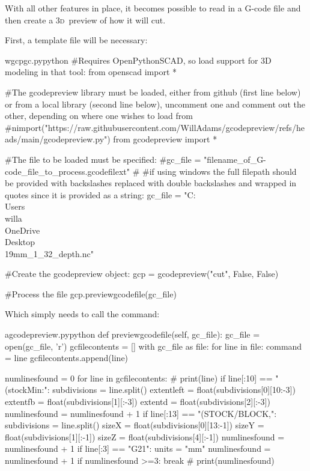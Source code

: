 \documentclass{ltxdoc}
\begin{document}
With all other features in place, it becomes possible to read in a G-code file and then create a \textsc{3d}~preview of how it will cut. 

First, a template file will be necessary:

\lstset{firstnumber=1}%
\begin{writecode}{w}{gcpgc.py}{python}
#Requires OpenPythonSCAD, so load support for 3D modeling in that tool:
from openscad import *

#The gcodepreview library must be loaded, either from github (first line below) or from a local library (second line below), uncomment one and comment out the other, depending on where one wishes to load from
#nimport("https://raw.githubusercontent.com/WillAdams/gcodepreview/refs/heads/main/gcodepreview.py")
from gcodepreview import *

#The file to be loaded must be specified:
#gc_file = "filename_of_G-code_file_to_process.gcodefilext"
#
#if using windows the full filepath should be provided with backslashes replaced with double backslashes and wrapped in quotes since it is provided as a string:
gc_file = "C:\\Users\\willa\\OneDrive\\Desktop\\19mm_1_32_depth.nc"

#Create the gcodepreview object:
gcp = gcodepreview("cut", False, False)

#Process the file
gcp.previewgcodefile(gc_file)

\end{writecode}

\noindent Which simply needs to call the  command:

\lstset{firstnumber=\thegcpy}
\begin{writecode}{a}{gcodepreview.py}{python}
    def previewgcodefile(self, gc_file):
        gc_file = open(gc_file, 'r')
        gcfilecontents = []
        with gc_file as file:
            for line in file:
                command = line
                gcfilecontents.append(line)

        numlinesfound = 0
        for line in gcfilecontents:
#            print(line)
            if line[:10] == "(stockMin:":
                subdivisions = line.split()
                extentleft = float(subdivisions[0][10:-3])
                extentfb = float(subdivisions[1][:-3])
                extentd = float(subdivisions[2][:-3])
                numlinesfound = numlinesfound + 1
            if line[:13] == "(STOCK/BLOCK,":
                subdivisions = line.split()
                sizeX = float(subdivisions[0][13:-1])
                sizeY = float(subdivisions[1][:-1])
                sizeZ = float(subdivisions[4][:-1])
                numlinesfound = numlinesfound + 1
            if line[:3] == "G21":
                units = "mm"
                numlinesfound = numlinesfound + 1
            if numlinesfound >=3:
                break
#            print(numlinesfound)

\end{writecode}
\addtocounter{gcpy}{30}
\end{document}
